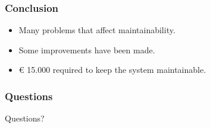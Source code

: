 \documentclass{beamer}
\begin{document}
\begin{frame}
    \frametitle{Conclusion}
    \begin{itemize}
    		\item Many problems that affect maintainability.
    		\item Some improvements have been made.
    		\item $\euro{}$ 15.000 required to keep the system maintainable.
    \end{itemize}
\end{frame}

\begin{frame}
    \frametitle{Questions}
    \hspace{.25\linewidth}
    \Huge{Questions?}
\end{frame}
\end{document}

